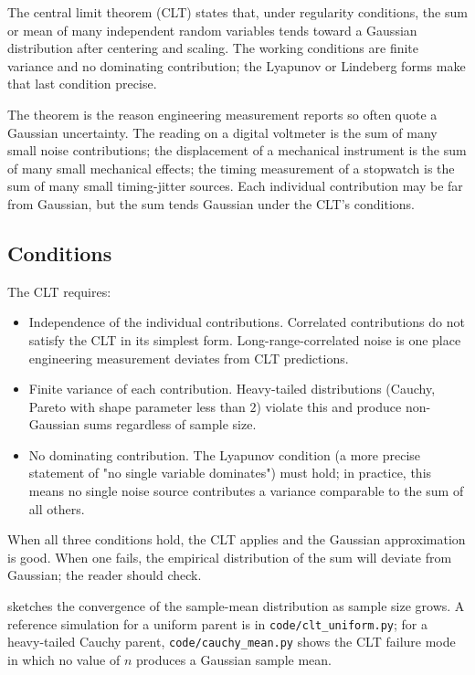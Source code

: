 The central limit theorem (CLT) states that, under regularity
conditions, the sum or mean of many independent random variables
tends toward a Gaussian distribution after centering and scaling.
The working conditions are finite variance and no dominating
contribution; the Lyapunov or Lindeberg forms make that last
condition precise.

The theorem is the reason engineering measurement reports so often
quote a Gaussian uncertainty. The reading on a digital voltmeter is
the sum of many small noise contributions; the displacement of a
mechanical instrument is the sum of many small mechanical effects;
the timing measurement of a stopwatch is the sum of many small
timing-jitter sources. Each individual contribution may be far from
Gaussian, but the sum tends Gaussian under the CLT's conditions.

\subsection{Conditions}

The CLT requires:

\begin{itemize}[leftmargin=*]
  \item Independence of the individual contributions. Correlated
    contributions do not satisfy the CLT in its simplest form.
    Long-range-correlated noise is one place engineering
    measurement deviates from CLT predictions.
  \item Finite variance of each contribution. Heavy-tailed
    distributions (Cauchy, Pareto with shape parameter less than
    $2$) violate this and produce non-Gaussian sums regardless of
    sample size.
  \item No dominating contribution. The Lyapunov condition (a more
    precise statement of "no single variable dominates") must hold;
    in practice, this means no single noise source contributes a
    variance comparable to the sum of all others.
\end{itemize}

When all three conditions hold, the CLT applies and the Gaussian
approximation is good. When one fails, the empirical distribution
of the sum will deviate from Gaussian; the reader should check.



 sketches the convergence of
the sample-mean distribution as sample size grows. A reference
simulation for a uniform parent is in \texttt{code/clt\_uniform.py};
for a heavy-tailed Cauchy parent, \texttt{code/cauchy\_mean.py}
shows the CLT failure mode in which no value of $n$ produces a
Gaussian sample mean.

